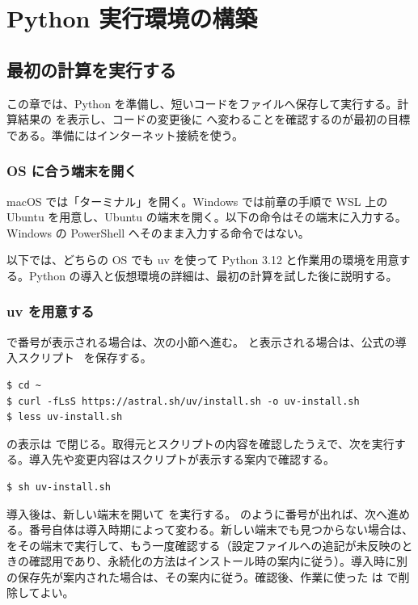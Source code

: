 \chapter{Python 実行環境の構築}
\label{chap:setup}

\section{最初の計算を実行する}
\label{sec:setup-first}

この章では、Python を準備し、短いコードをファイルへ保存して実行する。計算結果の  を表示し、コードの変更後に  へ変わることを確認するのが最初の目標である。準備にはインターネット接続を使う。

\subsection{OS に合う端末を開く}

macOS では「ターミナル」を開く。Windows では前章の手順で WSL 上の Ubuntu を用意し、Ubuntu の端末を開く。以下の命令はその端末に入力する。Windows の PowerShell へそのまま入力する命令ではない。

以下では、どちらの OS でも uv を使って Python 3.12 と作業用の環境を用意する。Python の導入と仮想環境の詳細は、最初の計算を試した後に説明する。

\subsection{uv を用意する}

 で番号が表示される場合は、次の小節へ進む。 と表示される場合は、公式の導入スクリプト~\cite{uv_install} を保存する。

\begin{lstlisting}[numbers=none, xleftmargin=2\zw]
$ cd ~
$ curl -fLsS https://astral.sh/uv/install.sh -o uv-install.sh
$ less uv-install.sh
\end{lstlisting}

 の表示は  で閉じる。取得元とスクリプトの内容を確認したうえで、次を実行する。導入先や変更内容はスクリプトが表示する案内で確認する。

\begin{lstlisting}[numbers=none, xleftmargin=2\zw]
$ sh uv-install.sh
\end{lstlisting}

導入後は、新しい端末を開いて  を実行する。 のように番号が出れば、次へ進める。番号自体は導入時期によって変わる。新しい端末でも見つからない場合は、 をその端末で実行して、もう一度確認する（設定ファイルへの追記が未反映のときの確認用であり、永続化の方法はインストール時の案内に従う）。導入時に別の保存先が案内された場合は、その案内に従う。確認後、作業に使った  は  で削除してよい。

